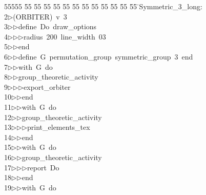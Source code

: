 %
%
\begin{tabbing}
55555 \= 55 \= 55 \= 55 \= 55 \= 55 \= 55 \= 55 \= 55 \= 55 \= 55 \= 55 \= 55 \= \>Symmetric\_3\_long:\\[0pt]
2\>$\triangleright$\>(ORBITER)\ v\ 3\ \\[0pt]
3\>$\triangleright$\>$\triangleright$\>define\ Do\ draw\_options\ \\[0pt]
4\>$\triangleright$\>$\triangleright$\>$\triangleright$\>radius\ 200\ line\_width\ 03\ \\[0pt]
5\>$\triangleright$\>$\triangleright$\>end\ \\[0pt]
6\>$\triangleright$\>$\triangleright$\>define\ G\ permutation\_group\ symmetric\_group\ 3\ end\ \\[0pt]
7\>$\triangleright$\>$\triangleright$\>with\ G\ do\ \\[0pt]
8\>$\triangleright$\>$\triangleright$\>group\_theoretic\_activity\ \\[0pt]
9\>$\triangleright$\>$\triangleright$\>$\triangleright$\>export\_orbiter\ \\[0pt]
10\>$\triangleright$\>$\triangleright$\>end\ \\[0pt]
11\>$\triangleright$\>$\triangleright$\>with\ G\ do\ \\[0pt]
12\>$\triangleright$\>$\triangleright$\>group\_theoretic\_activity\ \\[0pt]
13\>$\triangleright$\>$\triangleright$\>$\triangleright$\>print\_elements\_tex\ \\[0pt]
14\>$\triangleright$\>$\triangleright$\>end\ \\[0pt]
15\>$\triangleright$\>$\triangleright$\>with\ G\ do\ \\[0pt]
16\>$\triangleright$\>$\triangleright$\>group\_theoretic\_activity\ \\[0pt]
17\>$\triangleright$\>$\triangleright$\>$\triangleright$\>report\ Do\ \\[0pt]
18\>$\triangleright$\>$\triangleright$\>end\ \\[0pt]
19\>$\triangleright$\>$\triangleright$\>with\ G\ do\ \\[0pt]

\end{tabbing}
